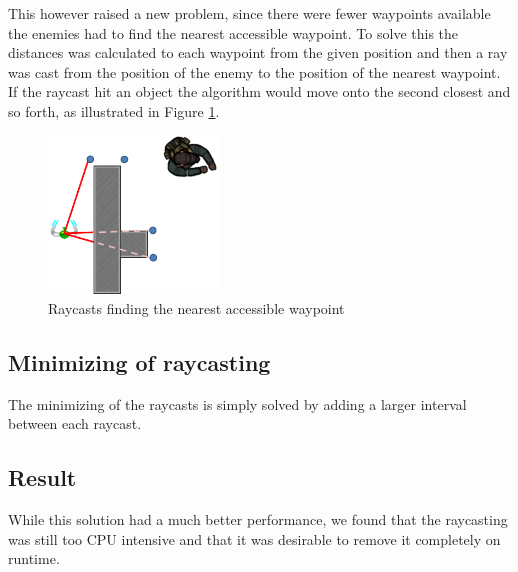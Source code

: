 This however raised a new problem, since there were fewer waypoints available the enemies had to find the nearest accessible waypoint.
To solve this the distances was calculated to each waypoint from the given position and then a ray was cast from the position of the enemy to the position of the nearest waypoint.
If the raycast hit an object the algorithm would move onto the second closest and so forth, as illustrated in Figure \ref{nearestWaypoint}.
\begin{figure}[H]
\begin{center}

	\includegraphics[width=0.4\textwidth]{figures/astar/findNearestWaypoint}
	\caption{Raycasts finding the nearest accessible waypoint}
	\label{nearestWaypoint}
	
\end{center}
\end{figure}

\subsection*{Minimizing of raycasting}
The minimizing of the raycasts is simply solved by adding a larger interval between each raycast.

\subsection*{Result}
While this solution had a much better performance, we found that the raycasting was still too CPU intensive and that it was desirable to remove it completely on runtime.